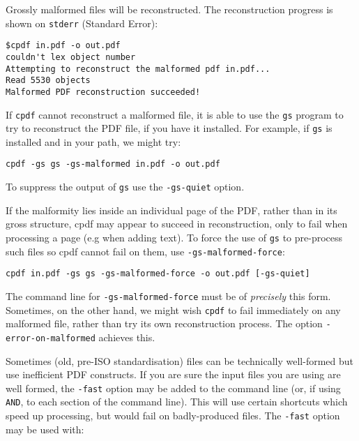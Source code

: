 \documentclass{book}
\begin{document}
Grossly malformed files will be reconstructed. The reconstruction
progress is shown on \verb!stderr! (Standard Error):

\begin{framed}
\noindent\small\verb!$cpdf in.pdf -o out.pdf!\\
\small\verb!couldn't lex object number!\\
\small\verb!Attempting to reconstruct the malformed pdf in.pdf...!\\
\small\verb!Read 5530 objects!\\
\small\verb$Malformed PDF reconstruction succeeded!$
\end{framed}

\noindent If \texttt{cpdf} cannot reconstruct a malformed file, it is able to use the \texttt{gs} program to try to reconstruct the PDF file, if you have it installed. For example, if \texttt{gs} is installed and in your path, we might try:

\begin{framed}
\noindent\small\verb!cpdf -gs gs -gs-malformed in.pdf -o out.pdf!\end{framed}

\noindent To suppress the output of \texttt{gs} use the \texttt{-gs-quiet} option.

If the malformity lies inside an individual page of the PDF, rather than in its gross structure, cpdf may appear to succeed in reconstruction, only to fail when processing a page (e.g when adding text). To force the use of \texttt{gs} to pre-process such files so cpdf cannot fail on them, use \texttt{-gs\--malformed\--force}:

\begin{framed}
\noindent\small\verb!cpdf in.pdf -gs gs -gs-malformed-force -o out.pdf [-gs-quiet]!\end{framed}

\noindent The command line for \texttt{-gs-malformed-force} must be of \textit{precisely} this form. Sometimes, on the other hand, we might wish \texttt{cpdf} to fail immediately on any malformed file, rather than try its own reconstruction process. The option \texttt{-error-on-malformed} achieves this.


Sometimes (old, pre-ISO standardisation) files can be technically well-formed but use inefficient PDF
constructs.  If you are sure the input files you are using are
well formed, the \texttt{-fast} option may be added to the command line (or, if
using \texttt{AND}, to each section of the command line). This will use certain
shortcuts which speed up processing, but would fail on badly-produced files. The \verb!-fast! option may be used with:
\end{document}
